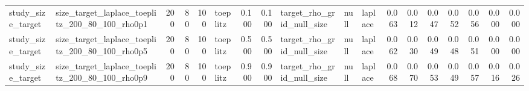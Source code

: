 \begin{tabular}{llrrrlrrlllrrrrrrr}
study\_size\_target & size\_target\_laplace\_toeplitz\_200\_80\_100\_rho0p1 & 200 & 80 & 100 & toeplitz & 0.100 & 0.100 & target\_rho\_grid\_null\_size & null & laplace & 0.063 & 0.012 & 0.047 & 0.052 & 0.056 & 0.000 & 0.000 \\
study\_size\_target & size\_target\_laplace\_toeplitz\_200\_80\_100\_rho0p5 & 200 & 80 & 100 & toeplitz & 0.500 & 0.500 & target\_rho\_grid\_null\_size & null & laplace & 0.062 & 0.030 & 0.049 & 0.048 & 0.051 & 0.000 & 0.000 \\
study\_size\_target & size\_target\_laplace\_toeplitz\_200\_80\_100\_rho0p9 & 200 & 80 & 100 & toeplitz & 0.900 & 0.900 & target\_rho\_grid\_null\_size & null & laplace & 0.068 & 0.070 & 0.053 & 0.049 & 0.057 & 0.016 & 0.026 \\
\bottomrule
\end{tabular}
